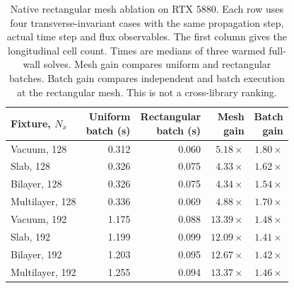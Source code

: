 \begin{table}[tbp]
\centering
\small
\renewcommand{\arraystretch}{1.15}
\caption{Native rectangular mesh ablation on RTX 5880. Each row uses four transverse-invariant cases with the same propagation step, actual time step and flux observables. The first column gives the longitudinal cell count. Times are medians of three warmed full-wall solves. Mesh gain compares uniform and rectangular batches. Batch gain compares independent and batch execution at the rectangular mesh. This is not a cross-library ranking.}
\label{tab:rectilinear-ensembles}
\begin{tabular}{@{}lrrrr@{}}
\toprule
Fixture, $N_x$ & \shortstack{Uniform\\batch (s)} & \shortstack{Rectangular\\batch (s)} & \shortstack{Mesh\\gain} & \shortstack{Batch\\gain} \\
\midrule
Vacuum, 128 & 0.312 & 0.060 & $5.18\times$ & $1.80\times$ \\
Slab, 128 & 0.326 & 0.075 & $4.33\times$ & $1.62\times$ \\
Bilayer, 128 & 0.326 & 0.075 & $4.34\times$ & $1.54\times$ \\
Multilayer, 128 & 0.336 & 0.069 & $4.88\times$ & $1.70\times$ \\
Vacuum, 192 & 1.175 & 0.088 & $13.39\times$ & $1.48\times$ \\
Slab, 192 & 1.199 & 0.099 & $12.09\times$ & $1.41\times$ \\
Bilayer, 192 & 1.203 & 0.095 & $12.67\times$ & $1.42\times$ \\
Multilayer, 192 & 1.255 & 0.094 & $13.37\times$ & $1.46\times$ \\
\bottomrule
\end{tabular}
\end{table}
